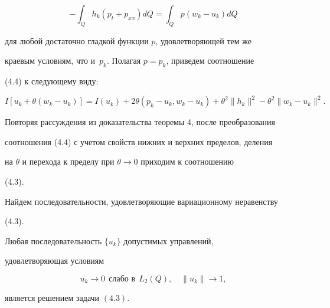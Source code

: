 \begin{pf}
$$ 


-\int_Q h_k(p_t+p_{xx})d Q=\int_Q p(w_k-u_k)d Q 


$$ 


для любой достаточно гладкой функции $p$, удовлетворяющей тем же 


краевым условиям, что и~$p_k$. Полагая $p=p_k$, приведем соотношение 


(4.4) к следующему виду: 


$$ 


I[u_k+\theta(w_k-u_k)]=I(u_k)+2\theta(p_k-u_k,w_k-u_k) 


+\theta^2\|h_k\|^2-\theta^2\|w_k-u_k\|^2. 


$$ 


Повторяя рассуждения из доказательства теоремы 4, после преобразования 


соотношения (4.4) с учетом свойств нижних и верхних пределов, деления 


на $\theta$ и перехода к пределу при $\theta\to0$ приходим к соотношению 


(4.3). 


\end{pf} 


 


Найдем последовательности, удовлетворяющие вариационному неравенству 


(4.3). 


 


\begin{thm} 


Любая последовательность $\{u_k\}$ допустимых управлений, 


удовлетворяющая условиям 


\begin{equation} 


u_k\to 0\ \ \text{слабо в} \ \ L_2(Q),\quad \|u_k\|\to1, 


\end{equation} 


является решением задачи $(4.3)$. 


\end{thm} 


 


